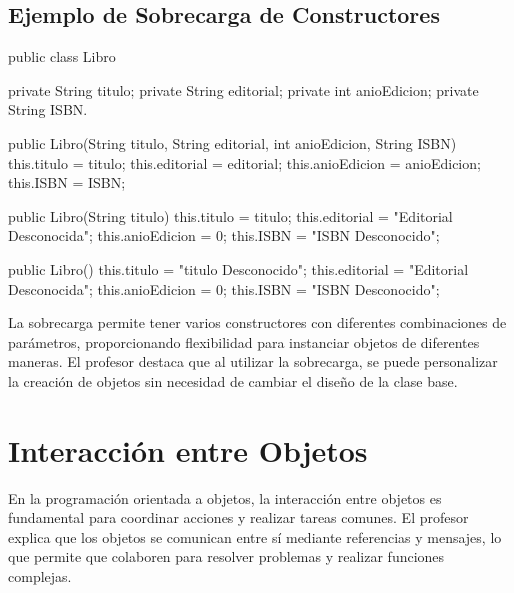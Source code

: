 \documentclass[a4paper]{report}
\begin{document}
\subsection{Ejemplo de Sobrecarga de Constructores}
\begin{roundedlst}
public class Libro {
    private String titulo;
    private String editorial;
    private int anioEdicion;
    private String ISBN.

    public Libro(String titulo, String editorial, 
                 int anioEdicion, String ISBN) {
        this.titulo = titulo;
        this.editorial = editorial;
        this.anioEdicion = anioEdicion;
        this.ISBN = ISBN;
    }

    public Libro(String titulo) {
        this.titulo = titulo;
        this.editorial = "Editorial Desconocida";
        this.anioEdicion = 0;
        this.ISBN = "ISBN Desconocido";
    }

    public Libro() {
        this.titulo = "titulo Desconocido";
        this.editorial = "Editorial Desconocida";
        this.anioEdicion = 0;
        this.ISBN = "ISBN Desconocido";
    }
}
\end{roundedlst}

La sobrecarga permite tener varios constructores con diferentes combinaciones de parámetros, proporcionando flexibilidad para instanciar objetos de diferentes maneras. El profesor destaca que al utilizar la sobrecarga, se puede personalizar la creación de objetos sin necesidad de cambiar el diseño de la clase base.

\section{Interacción entre Objetos}
En la programación orientada a objetos, la interacción entre objetos es fundamental para coordinar acciones y realizar tareas comunes. El profesor explica que los objetos se comunican entre sí mediante referencias y mensajes, lo que permite que colaboren para resolver problemas y realizar funciones complejas.
\end{document}
